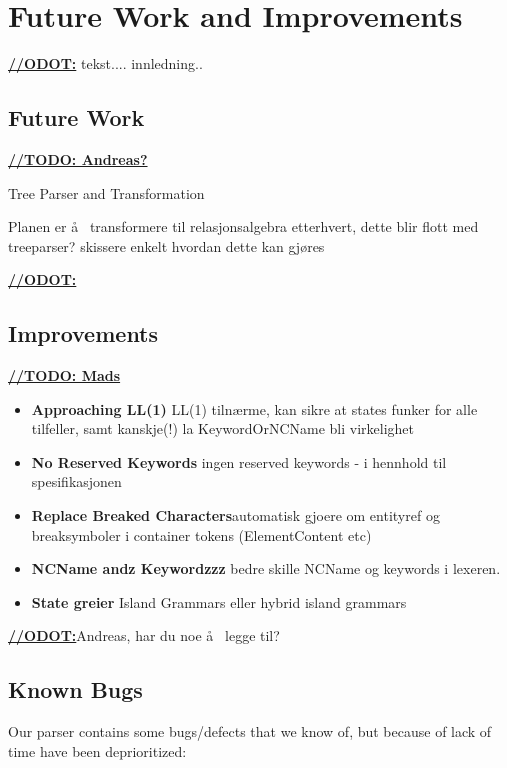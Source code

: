 \chapter{Future Work and Improvements}
\label{sect:summary:future_work}
\underline{\textbf{\LARGE //ODOT:}} tekst.... innledning..


\section{Future Work}
\underline{\textbf{\LARGE //TODO: Andreas?}}

Tree Parser and Transformation

Planen er \aa~ transformere til relasjonsalgebra etterhvert, dette blir flott med treeparser? skissere enkelt hvordan dette kan gj\o res

\underline{\textbf{\LARGE //ODOT:}}

\section{Improvements}
\label{sect:future:improvements}
\underline{\textbf{\LARGE //TODO: Mads}} 

\begin{itemize}
\item \textbf{Approaching LL(1)} LL(1) tiln\ae rme, kan sikre at states funker for alle tilfeller, samt kanskje(!) la KeywordOrNCName bli virkelighet

\item \textbf{No Reserved Keywords}  ingen reserved keywords - i hennhold til spesifikasjonen

\item \textbf{Replace Breaked Characters}automatisk gjoere om entityref og breaksymboler i container tokens (ElementContent etc)

\item \textbf{NCName andz Keywordzzz} bedre skille NCName og keywords i lexeren.

\item \textbf{State greier} Island Grammars eller hybrid island grammars

\end{itemize}

\underline{\textbf{\LARGE //ODOT:}}Andreas, har du noe \aa~ legge til?

\section{Known Bugs}
\label{sect:future:knownBugs}
Our parser contains some bugs/defects that we know of, but because of lack of time have been deprioritized:

